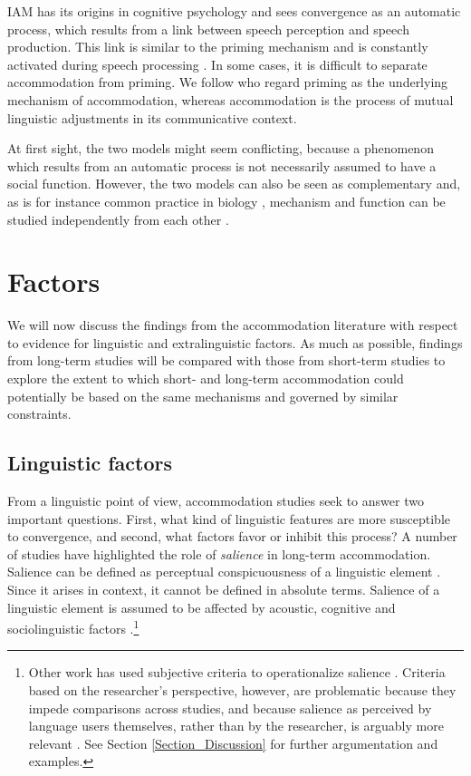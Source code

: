 \documentclass[output=paper]{langscibook}
\begin{document}
IAM \citep{pickering_toward_2004} has its origins in cognitive psychology and sees convergence as an automatic process, which results from a link between speech perception and speech production. This link is similar to the priming mechanism and is constantly activated during speech processing \citep{pickering_toward_2004}. In some cases, it is difficult to separate accommodation from priming. We follow \textcite{pickering_toward_2004} who regard priming as the underlying mechanism of accommodation, whereas accommodation is the process of mutual linguistic adjustments in its communicative context.

At first sight, the two models might seem conflicting, because a phenomenon which results from an automatic process is not necessarily assumed to have a social function. However, the two models can also be seen as complementary and, as is for instance common practice in biology \parencite{tinbergen1963aims}, mechanism and function can be studied independently from each other \citep{ruch_function_2018}.

\section{Factors} \label{Section_Factors}

We will now discuss the findings from the accommodation literature with respect to evidence for linguistic and extralinguistic factors. As much as possible, findings from long-term studies will be compared with those from short-term studies to explore the extent to which short- and long-term accommodation could potentially be based on the same mechanisms and governed by similar constraints.

\subsection{Linguistic factors}
From a linguistic point of view, accommodation studies seek to answer two important questions. First, what kind of linguistic features are more susceptible to convergence, and second, what factors favor or inhibit this process? A number of studies have highlighted the role of \textit{salience} in long-term accommodation. Salience can be defined as perceptual conspicuousness of a linguistic element \citep{lenz_zum_2010}. Since it arises in context, it cannot be defined in absolute terms.  Salience of a linguistic element is assumed to be affected by acoustic, cognitive and sociolinguistic factors \citep{auer_anmerkungen_2014}.\footnote{Other work has used subjective criteria to operationalize salience \citep[see examples reviewed in][]{wilson_types_2011,macleod_critical_2015}. Criteria based on the researcher's perspective, however, are problematic because they impede comparisons across studies, and because salience as perceived by language users themselves, rather than by the researcher, is arguably more relevant \citep[see][]{macleod_critical_2015}. See Section \ref{Section_Discussion} for further argumentation and examples.}
\end{document}
